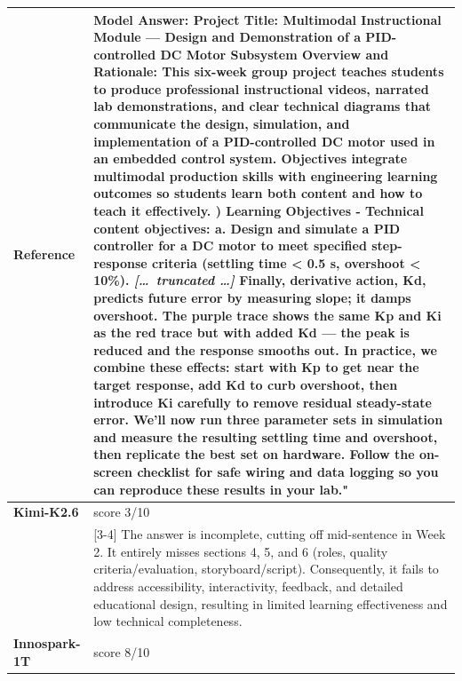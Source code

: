 \begin{longtable}{@{}l p{12.5cm}@{}}
  \textbf{Reference} & Model Answer: \newline Project Title: Multimodal Instructional Module --- Design and Demonstration of a PID-controlled DC Motor Subsystem \newline Overview and Rationale: This six-week group project teaches students to produce professional instructional videos, narrated lab demonstrations, and clear technical diagrams that communicate the design, simulation, and implementation of a PID-controlled DC motor used in an embedded control system. Objectives integrate multimodal production skills with engineering learning outcomes so students learn both content and how to teach it effectively. \newline 1) Learning Objectives \newline - Technical content objectives: \newline a. Design and simulate a PID controller for a DC motor to meet specified step-response criteria (settling time \textless{} 0.5 s, overshoot \textless{} 10\%). \newline \textit{[\ldots\ truncated \ldots]} \newline Finally, derivative action, Kd, predicts future error by measuring slope; it damps overshoot. The purple trace shows the same Kp and Ki as the red trace but with added Kd --- the peak is reduced and the response smooths out. In practice, we combine these effects: start with Kp to get near the target response, add Kd to curb overshoot, then introduce Ki carefully to remove residual steady-state error. \newline We'll now run three parameter sets in simulation and measure the resulting settling time and overshoot, then replicate the best set on hardware. Follow the on-screen checklist for safe wiring and data logging so you can reproduce these results in your lab." \\
  \midrule
  \textbf{Kimi-K2.6} & score 3/10 \\
  & [3-4] The answer is incomplete, cutting off mid-sentence in Week 2. It entirely misses sections 4, 5, and 6 (roles, quality criteria/evaluation, storyboard/script). Consequently, it fails to address accessibility, interactivity, feedback, and detailed educational design, resulting in limited learning effectiveness and low technical completeness. \\
  \textbf{Innospark-1T} & score 8/10 \\

\end{longtable}
